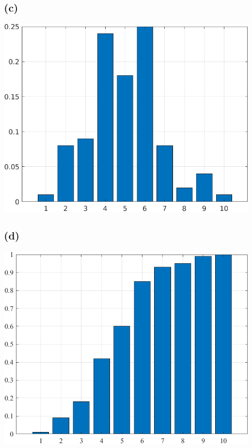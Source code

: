 \documentclass[a4paper]{scrartcl}
\begin{document}
\subsection*{(c)}

\begin{center}
	\includegraphics*[scale = 0.5]{question4c.png}
\end{center}

\subsection*{(d)}

\begin{center}
	\includegraphics*[scale = 0.5]{question4d.png}
\end{center}
\end{document}
